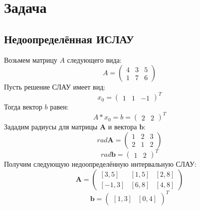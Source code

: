 \section{Задача}

\subsection{Недоопределённая ИСЛАУ}
Возьмем матрицу $A$ следующего вида:
\begin{equation}
	A =
	\begin{pmatrix}
		4 & 3 & 5 \\
		1 & 7 & 6
	\end{pmatrix}
\end{equation}
Пусть решение СЛАУ имеет вид:
\begin{equation}
	x_0=
	\begin{pmatrix}
		1 & 1 & -1
	\end{pmatrix}^T
\end{equation}
Тогда вектор $b$ равен:
\begin{equation}
	A*x_0=b=
	\begin{pmatrix}
		2 & 2
	\end{pmatrix}^T
\end{equation}
Зададим радиусы для матрицы $\textbf{A}$ и вектора $\textbf{b}$:
\begin{equation}
	rad \textbf{A}=
	\begin{pmatrix}
		1 & 2 & 3 \\
		2 & 1 & 2
	\end{pmatrix}
\end{equation}
\begin{equation}
	rad \textbf{b}=
	\begin{pmatrix}
		1 & 2
	\end{pmatrix}^T
\end{equation}
Получим следующую недоопределённую интервальную СЛАУ:
\begin{equation}
	\textbf{A}=
	\begin{pmatrix}
		[3,5] & [1,5] & [2,8] \\
		[-1,3] & [6,8] & [4,8]
	\end{pmatrix}
\end{equation}
\begin{equation}
	\textbf{b}=
	\begin{pmatrix}
		[1,3] & [0,4]
	\end{pmatrix}^T
\end{equation}


